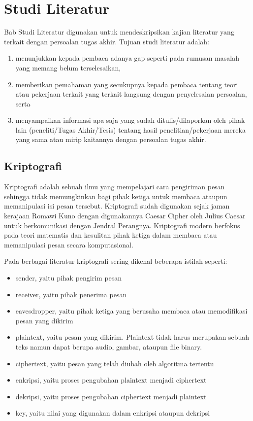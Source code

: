 \chapter{Studi Literatur}

Bab Studi Literatur digunakan untuk mendeskripsikan kajian literatur yang terkait dengan persoalan tugas akhir. Tujuan studi literatur adalah:

\begin{enumerate}
    \item menunjukkan kepada pembaca adanya gap seperti pada rumusan masalah yang memang belum terselesaikan,
    \item memberikan pemahaman yang secukupnya kepada pembaca tentang teori atau pekerjaan terkait yang terkait langsung dengan penyelesaian persoalan, serta
    \item menyampaikan informasi apa saja yang sudah ditulis/dilaporkan oleh pihak lain (peneliti/Tugas Akhir/Tesis) tentang hasil penelitian/pekerjaan mereka yang sama atau mirip kaitannya dengan persoalan tugas akhir.
\end{enumerate}

\section{Kriptografi}
  Kriptografi adalah sebuah ilmu yang mempelajari cara pengiriman pesan sehingga tidak memungkinkan bagi pihak ketiga untuk membaca ataupun memanipulasi isi pesan tersebut. Kriptografi sudah digunakan sejak jaman kerajaan Romawi Kuno dengan digunakannya Caesar Cipher oleh Julius Caesar untuk berkomunikasi dengan Jendral Perangnya. Kriptografi modern berfokus pada teori matematis dan kesulitan pihak ketiga dalam membaca atau memanipulasi pesan secara komputasional.

  Pada berbagai literatur kriptografi sering dikenal beberapa istilah seperti:
  \begin{itemize}
    \item sender, yaitu pihak pengirim pesan
    \item receiver, yaitu pihak penerima pesan
    \item eavesdropper, yaitu pihak ketiga yang berusaha membaca atau memodifikasi pesan yang dikirim
    \item plaintext, yaitu pesan yang dikirim. Plaintext tidak harus merupakan sebuah teks namun dapat berupa audio, gambar, ataupun file binary.
    \item ciphertext, yaitu pesan yang telah diubah oleh algoritma tertentu
    \item enkripsi, yaitu proses pengubahan plaintext menjadi ciphertext
    \item dekripsi, yaitu proses pengubahan ciphertext menjadi plaintext
    \item key, yaitu nilai yang digunakan dalam enkripsi ataupun dekripsi
  \end{itemize}

